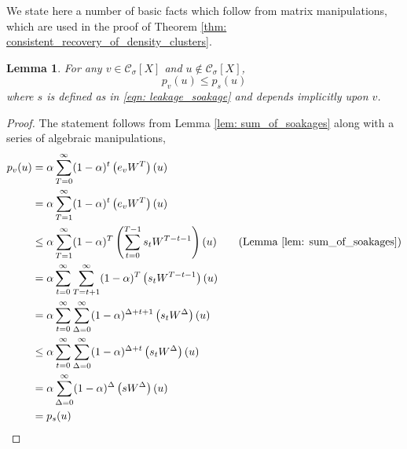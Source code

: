 \documentclass[11pt,twoside]{article}
\newtheorem{lemma}{Lemma}
\newcommand{\1}{\mathbf{1}}
\newcommand{\pbf}{p}        %
\newcommand{\Xbf}{X}             %
\newcommand{\Wbf}{W}
\newcommand{\Cset}{\mathcal{C}}
\newcommand{\Csig}{\Cset_{\sigma}}
\begin{document}
We state here a number of basic facts which follow from matrix manipulations, which are used in the proof of Theorem \ref{thm: consistent_recovery_of_density_clusters}. 

\begin{lemma}
	\label{lem: soakage_ppr_lb}
	For any $v \in \Csig[\Xbf]$ and $u \not\in \Csig[\Xbf]$,
	\begin{equation*}
	\pbf_{v}(u) \leq \pbf_{s}(u)
	\end{equation*}
	where $s$ is defined as in \eqref{eqn: leakage_soakage} and depends implicitly upon $v$.
\end{lemma}
\begin{proof}
	The statement follows from Lemma \ref{lem: sum_of_soakages} along with a series of algebraic manipulations,
	\begin{align*}
	\pbf_v(u) & = \alpha\sum_{T = 0}^{\infty} (1 - \alpha)^t \left(e_v \Wbf^T\right)(u) \\
	& = \alpha\sum_{T = 1}^{\infty} (1 - \alpha)^t \left(e_v \Wbf^T\right)(u) \\
	& \leq \alpha \sum_{T=1}^{\infty} (1 - \alpha)^T \left( \sum_{t = 0}^{T - 1} s_t \Wbf^{T - t - 1} \right)(u) \tag{Lemma \ref{lem: sum_of_soakages}}\\
	& = \alpha \sum_{t=0}^{\infty} \sum_{T = t + 1}^{\infty} (1 - \alpha)^T \left( s_t \Wbf^{T - t - 1} \right)(u)\\
	& = \alpha \sum_{t=0}^{\infty} \sum_{\Delta = 0}^{\infty} (1 - \alpha)^{\Delta + t + 1} \left( s_t \Wbf^{\Delta} \right)(u) \\
	& \leq \alpha \sum_{t=0}^{\infty} \sum_{\Delta = 0}^{\infty} (1 - \alpha)^{\Delta + t } \left( s_t \Wbf^{\Delta} \right)(u) \\
	& = \alpha \sum_{\Delta = 0}^{\infty} (1 - \alpha)^{\Delta} \left(s \Wbf^{\Delta}\right)(u) \\
	& = \pbf_s(u)
	\end{align*}
\end{proof}
\end{document}
